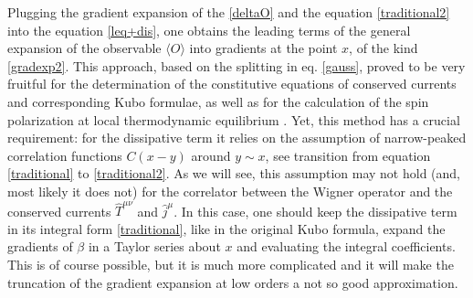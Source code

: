 \documentclass[prd,superscriptaddress,nofootinbib,notitlepage]{revtex4-1}
\def\wT{{\widehat T}}
\def\wj{{\widehat j}}
\begin{document}
Plugging the gradient expansion of the \eqref{deltaO} and the equation \eqref{traditional2} into the equation
\eqref{leq+dis}, one obtains the leading terms of the general expansion of the observable $\langle O \rangle$ into gradients
at the point $x$, of the kind \eqref{gradexp2}. This approach, based on the splitting in eq. \eqref{gauss}, proved to be 
very fruitful for the determination of the constitutive equations of conserved currents \cite{Hosoya:1983id} 
and corresponding Kubo formulae, as well as for the calculation of the spin polarization at local thermodynamic equilibrium
\cite{Becattini:2021suc,Liu:2021uhn}. Yet, this method has a crucial requirement: for the dissipative term it relies on the assumption
of narrow-peaked correlation functions $C(x-y)$ around $y \sim x$, see transition from equation \eqref{traditional} to
\eqref{traditional2}. As we will see, this assumption may not hold (and, most likely it does not) for the correlator between 
the Wigner operator and the conserved currents $\wT^{\mu\nu}$ and $\wj^\mu$. In this case, one should keep the dissipative
term in its integral form \eqref{traditional}, like in the original Kubo formula, expand the gradients of $\beta$ in a 
Taylor series about $x$ and evaluating the integral coefficients. This is of course possible, but it is much more complicated
and it will make the truncation of the gradient expansion at low orders a not so good approximation. 
\end{document}

